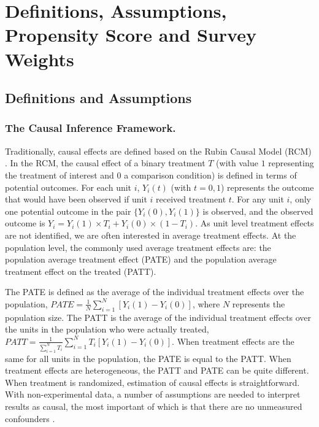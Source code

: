 \documentclass[oupdraft]{bio}
\begin{document}
\section{Definitions, Assumptions, Propensity Score and Survey Weights }
\label{S2}
\subsection{Definitions and Assumptions}
\label{S2.1}
\subsubsection*{The Causal Inference Framework.}
Traditionally, causal effects are defined based on the Rubin Causal Model (RCM) \citep{rubin1974estimating}. In the RCM, the causal effect of a binary treatment $T$ (with value $1$ representing the treatment of interest and $0$ a comparison condition) is defined in terms of potential outcomes. For each unit $i$, $Y_{i}(t)$ (with $t={0,1}$) represents the outcome that would have been observed if unit $i$ received treatment $t$. For any unit $i$, only one potential outcome in the pair $\{Y_{i}(0),Y_{i}(1)\}$ is observed, and the observed outcome is $Y_{i}=Y_{i}(1)\times T_{i} + Y_{i}(0)\times \left(1-T_{i}\right)$. As unit level treatment effects are not identified, we are often interested in average treatment effects. At the population level, the commonly used average treatment effects are: the  population average treatment effect (PATE) and the population average treatment effect on the treated (PATT). 

The PATE is defined as the average of the individual treatment effects over the population, $PATE=\frac{1}{N}\sum_{i=1}^{N}\left[Y_{i}(1)-Y_{i}(0)\right]$, where $N$ represents the population size. The PATT is the average of the individual treatment effects over the units in the population who were actually treated, $PATT=\frac{1}{\sum_{i=1}^{N}T_{i}}\sum_{i=1}^{N}T_{i}\left[Y_{i}(1)-Y_{i}(0)\right]$.
When treatment effects are the same for all units in the population, the PATE is equal to the PATT. When treatment effects are heterogeneous, the PATT and PATE can be quite different.  
When treatment is randomized, estimation of causal effects is straightforward. With non-experimental data, a number of assumptions are needed to interpret results as causal, the most important of which is that there are no unmeasured confounders \citep[for detailed discussions, see][]{rosenbaum1983central,hernan2017causal}.
\end{document}
